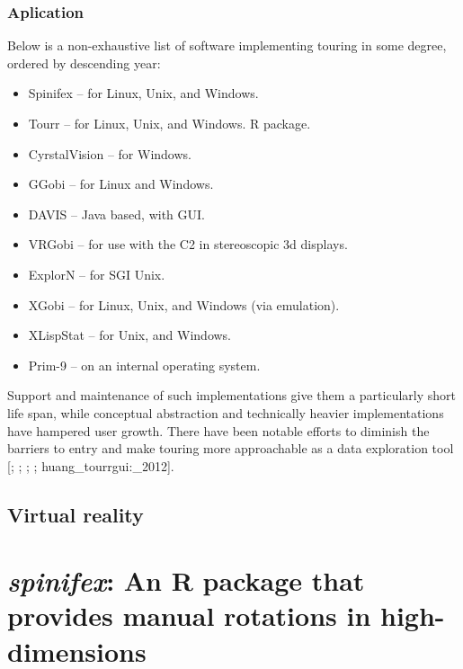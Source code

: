 \documentclass{monashthesis}
\begin{document}
\hypertarget{aplication}{%
\subsection{Aplication}\label{aplication}}

Below is a non-exhaustive list of software implementing touring in some degree, ordered by descending year:

\begin{itemize}
\tightlist
\item
  Spinifex \autocite{spinifex} -- for Linux, Unix, and Windows.
\item
  Tourr \autocite{wickham_tourr_2011} -- for Linux, Unix, and Windows. R package.
\item
  CyrstalVision \autocite{wegman_visual_2003} -- for Windows.
\item
  GGobi \autocite{swayne_ggobi:_2003} -- for Linux and Windows.
\item
  DAVIS \autocite{huh_davis:_2002} -- Java based, with GUI.
\item
  VRGobi \autocite{nelson_xgobi_1998} -- for use with the C2 in stereoscopic 3d displays.
\item
  ExplorN \autocite{carr_explorn:_1996} -- for SGI Unix.
\item
  XGobi \autocite{swayne_xgobi:_1991} -- for Linux, Unix, and Windows (via emulation).
\item
  XLispStat \autocite{tierney_lisp-stat:_1990} -- for Unix, and Windows.
\item
  Prim-9 \autocites{asimov_grand_1985}{fisherkeller_prim-9:_1974} -- on an internal operating system.
\end{itemize}

Support and maintenance of such implementations give them a particularly short life span, while conceptual abstraction and technically heavier implementations have hampered user growth. There have been notable efforts to diminish the barriers to entry and make touring more approachable as a data exploration tool {[}\textcite{huh_davis:_2002}; \textcite{swayne_ggobi:_2003}; \textcite{wegman_visual_2003}; \textcite{wickham_tourr_2011}; huang\_tourrgui:\_2012{]}.

\hypertarget{virtual-reality}{%
\section{Virtual reality}\label{virtual-reality}}

\hypertarget{ch:spinifex}{%
\chapter{\texorpdfstring{\emph{spinifex}: An R package that provides manual rotations in high-dimensions}{spinifex: An R package that provides manual rotations in high-dimensions}}\label{ch:spinifex}}
\end{document}
